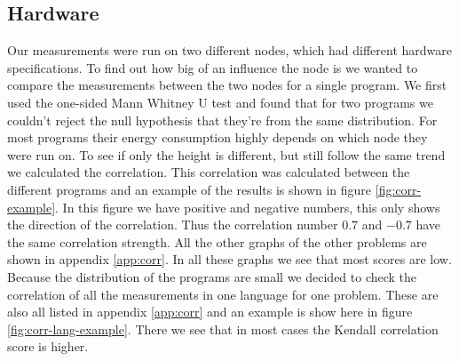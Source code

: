 \subsection{Hardware}
Our measurements were run on two different nodes, which had different hardware specifications. To find out how big of an influence the node is we wanted to compare the measurements between the two nodes for a single program. We first used the one-sided Mann Whitney U test and found that for two programs we couldn't reject the null hypothesis that they're from the same distribution. For most programs their energy consumption highly depends on which node they were run on. To see if only the height is different, but still follow the same trend we calculated the correlation. This correlation was calculated between the different programs and an example of the results is shown in figure \ref{fig:corr-example}. In this figure we have positive and negative numbers, this only shows the direction of the correlation. Thus the correlation number $0.7$ and $-0.7$ have the same correlation strength. All the other graphs of the other problems are shown in appendix \ref{app:corr}. In all these graphs we see that most scores are low. Because the distribution of the programs are small we decided to check the correlation of all the measurements in one language for one problem. These are also all listed in appendix \ref{app:corr} and an example is show here in figure \ref{fig:corr-lang-example}. There we see that in most cases the Kendall correlation score is higher.

